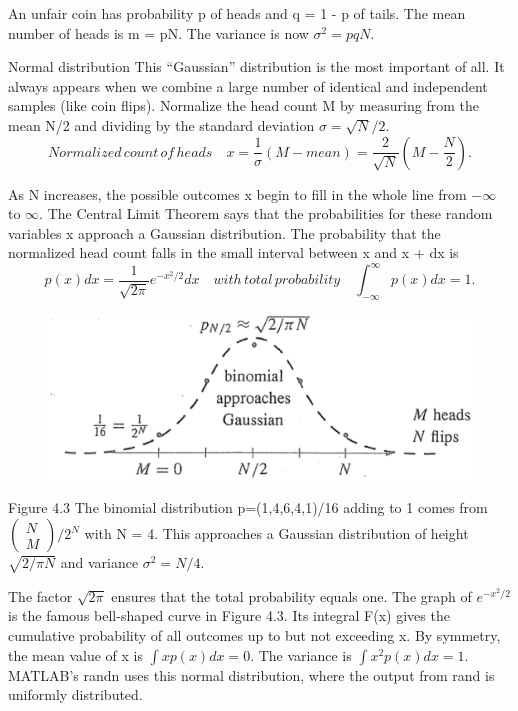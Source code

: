 	An unfair coin has probability p of heads and q = 1 - p of tails. The mean number
	of heads is m = pN. The variance is now $\sigma^2=pqN$.
	
	Normal distribution \; This “Gaussian” distribution is the most important of all. It always
	appears when we combine a large number of identical and independent samples (like coin flips). Normalize the head count M by measuring from the mean N/2 and dividing by the standard deviation $\sigma=\sqrt{N}/2$.
	\begin{equation*}
	Normalized\, count\, of\, heads \quad
	x=\frac{1}{\sigma}(M-mean)=\frac{2}{\sqrt{N}}(M-\frac{N}{2}).
	\end{equation*}
	
	As N increases, the possible outcomes x begin to fill in the whole line from $-\infty$ to $\infty$. The Central Limit Theorem says that the probabilities for these random variables x approach a Gaussian distribution. The probability that the normalized head count falls in the small interval between x and x + dx is
	\begin{equation}
	p(x)dx=\frac{1}{\sqrt{2\pi}}e^{-x^{2}/2}dx \quad
    with\,total\,probability 
	\quad\int^{\infty}_{-\infty}p(x)dx=1.
	\end{equation}
	
	\begin{figure}[h]
		\centering
		\includegraphics[width=0.7\linewidth]{TeX_files/Part02/chapter04/image/4-3}
		\caption{}
		\label{fig:4-3}
	\end{figure}
	
	Figure 4.3 \; The binomial distribution p=(1,4,6,4,1)/16 adding to 1 comes from$\begin{pmatrix}
	N \\ M \end{pmatrix}/2^N$ with N = 4. This approaches a Gaussian distribution of height
	$\sqrt{2/\pi N}$ and variance $\sigma^2=N/4$.
	
	The factor $\sqrt{2\pi}$ ensures that the total probability equals one. The graph of $e^{-x^{2}/2}$ is the famous bell-shaped curve in Figure 4.3. Its integral F(x) gives the cumulative
	probability of all outcomes up to but not exceeding x. By symmetry, the mean value
	of x is $\int xp(x)dx=0$. The variance is $\int x^2p(x)dx=1$. MATLAB’s randn uses
	this normal distribution, where the output from rand is uniformly distributed.
	
